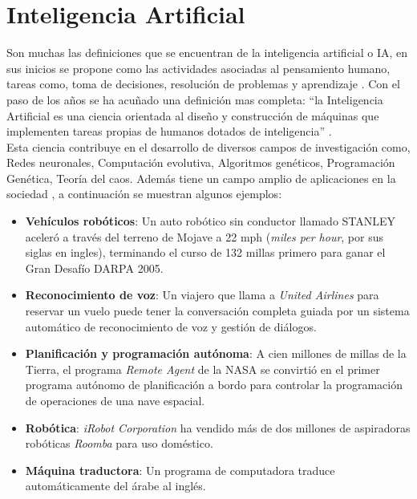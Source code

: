 

\section{Inteligencia Artificial}

Son muchas las definiciones que se encuentran de la inteligencia artificial o IA, en sus inicios se propone como las  actividades asociadas al pensamiento humano, tareas como, toma de decisiones, resolución de problemas y aprendizaje \citep{CT19}. Con el paso de los años se ha acuñado una definición mas completa: ``la Inteligencia Artificial es una ciencia orientada al diseño y construcción de máquinas que implementen tareas propias de humanos dotados de inteligencia'' \citep{CT1}.\\


Esta ciencia contribuye en el desarrollo de diversos campos de investigación como, Redes neuronales, Computación evolutiva, Algoritmos genéticos, Programación Genética, Teoría del caos. Además tiene un campo amplio de aplicaciones en la sociedad \citep{CT20}, a continuación se muestran algunos ejemplos:

\begin{itemize}

	\item \textbf{Vehículos robóticos}: Un auto robótico sin conductor llamado STANLEY aceleró a través del terreno de Mojave a 22 mph (\textit{miles per hour}, por sus siglas en ingles), terminando el curso de 132 millas primero para ganar el Gran Desafío DARPA 2005.

	\item \textbf{Reconocimiento de voz}: Un viajero que llama a \textit{United Airlines} para reservar un vuelo puede tener la conversación completa guiada por un sistema automático de reconocimiento de voz y gestión de diálogos.

	\item \textbf{Planificación y programación autónoma}: A cien millones de millas de la Tierra, el programa \textit{Remote Agent} de la NASA se convirtió en el primer programa autónomo de planificación a bordo para controlar la programación de operaciones de una nave espacial.

	\item \textbf{Robótica}: \textit{iRobot Corporation} ha vendido más de dos millones de aspiradoras robóticas \textit{Roomba} para uso doméstico.

	\item \textbf{Máquina traductora}: Un programa de computadora  traduce automáticamente del árabe al inglés.

\end{itemize} 
 

